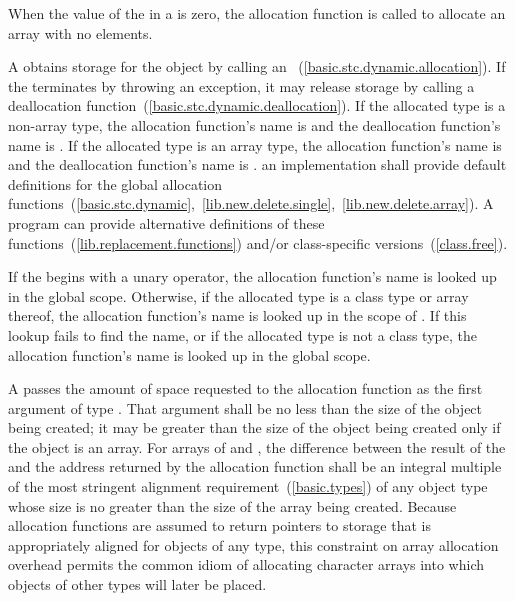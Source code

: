 \pnum
{}%
When the value of the  in a 
is zero, the allocation function is called to allocate an array with no elements.

\pnum
A  obtains storage for the object by calling an
~(\ref{basic.stc.dynamic.allocation}). If
the  terminates by throwing an exception, it
may release storage by calling a deallocation
function~(\ref{basic.stc.dynamic.deallocation}). If the allocated type
is a non-array type, the allocation function's name is
%
%
 and the deallocation function's name is
. If the allocated type is an array type, the
allocation function's name is
%
%
and the deallocation function's name is
.
\enternote 
an implementation shall provide default definitions for the global
allocation
functions~(\ref{basic.stc.dynamic},~\ref{lib.new.delete.single},~\ref{lib.new.delete.array}).
A \Cpp program can provide alternative definitions of
these functions~(\ref{lib.replacement.functions}) and/or class-specific
versions~(\ref{class.free}).
\exitnote 

\pnum
{}%
If the  begins with a unary \tcode{::}
operator, the allocation function's name is looked up in the global
scope. Otherwise, if the allocated type is a class type  or
array thereof, the allocation function's name is looked up in the scope
of . If this lookup fails to find the name, or if the allocated
type is not a class type, the allocation function's name is looked up in
the global scope.

\pnum
A  passes the amount of space requested to the
allocation function as the first argument of type
. That argument shall be no less than the size
of the object being created; it may be greater than the size of the
object being created only if the object is an array. For arrays of
 and , the difference between the
result of the  and the address returned by the
allocation function shall be an integral multiple of the
most stringent alignment requirement~(\ref{basic.types}) of any object
type whose size is no greater than the size of the array being created.
\enternote 
{}%
Because allocation functions are assumed to return pointers to storage
that is appropriately aligned for objects of any type, this constraint
on array allocation overhead permits the common idiom of allocating
character arrays into which objects of other types will later be placed.
\exitnote 

